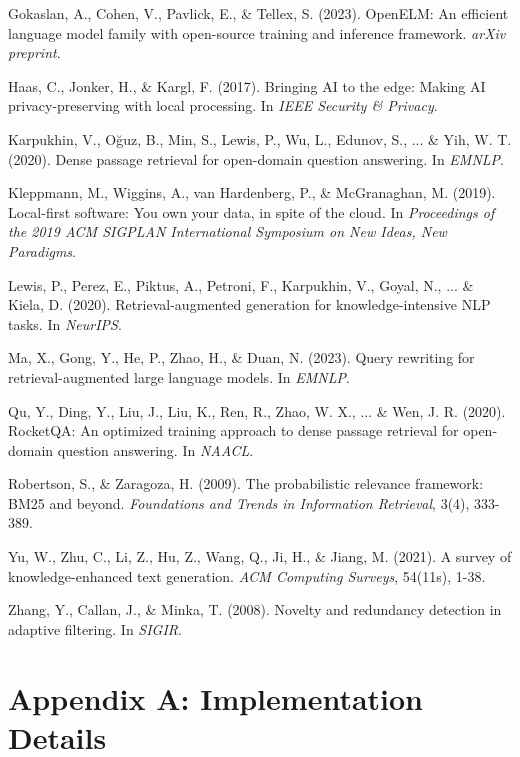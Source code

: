 \documentclass[letterpaper]{article}
\begin{document}
Gokaslan, A., Cohen, V., Pavlick, E., \& Tellex, S. (2023). OpenELM: An efficient language model family with open-source training and inference framework. \textit{arXiv preprint}.

Haas, C., Jonker, H., \& Kargl, F. (2017). Bringing AI to the edge: Making AI privacy-preserving with local processing. In \textit{IEEE Security \& Privacy}.

Karpukhin, V., Oğuz, B., Min, S., Lewis, P., Wu, L., Edunov, S., ... \& Yih, W. T. (2020). Dense passage retrieval for open-domain question answering. In \textit{EMNLP}.

Kleppmann, M., Wiggins, A., van Hardenberg, P., \& McGranaghan, M. (2019). Local-first software: You own your data, in spite of the cloud. In \textit{Proceedings of the 2019 ACM SIGPLAN International Symposium on New Ideas, New Paradigms}.

Lewis, P., Perez, E., Piktus, A., Petroni, F., Karpukhin, V., Goyal, N., ... \& Kiela, D. (2020). Retrieval-augmented generation for knowledge-intensive NLP tasks. In \textit{NeurIPS}.

Ma, X., Gong, Y., He, P., Zhao, H., \& Duan, N. (2023). Query rewriting for retrieval-augmented large language models. In \textit{EMNLP}.

Qu, Y., Ding, Y., Liu, J., Liu, K., Ren, R., Zhao, W. X., ... \& Wen, J. R. (2020). RocketQA: An optimized training approach to dense passage retrieval for open-domain question answering. In \textit{NAACL}.

Robertson, S., \& Zaragoza, H. (2009). The probabilistic relevance framework: BM25 and beyond. \textit{Foundations and Trends in Information Retrieval}, 3(4), 333-389.

Yu, W., Zhu, C., Li, Z., Hu, Z., Wang, Q., Ji, H., \& Jiang, M. (2021). A survey of knowledge-enhanced text generation. \textit{ACM Computing Surveys}, 54(11s), 1-38.

Zhang, Y., Callan, J., \& Minka, T. (2008). Novelty and redundancy detection in adaptive filtering. In \textit{SIGIR}.

\newpage

\section{Appendix A: Implementation Details}
\end{document}

